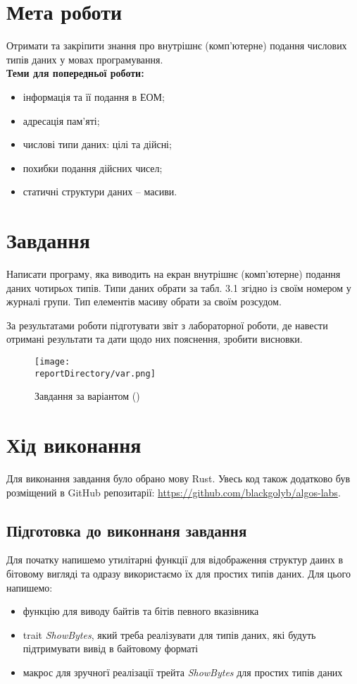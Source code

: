 \section{Мета роботи}
Отримати та закріпити знання про внутрішнє (комп’ютерне)
подання числових типів даних у мовах програмування.\\

\noindent
\textbf{Теми для попередньої роботи:}
\begin{itemize}
    \item інформація та її подання в ЕОМ;
    \item адресація пам’яті;
    \item числові типи даних: цілі та дійсні;
    \item похибки подання дійсних чисел;
    \item статичні структури даних – масиви.
\end{itemize}



\section{Завдання}
Написати програму, яка виводить на екран внутрішнє (комп’ютерне)
подання даних чотирьох типів. Типи даних обрати за табл. 3.1 згідно із своїм
номером у журналі групи. Тип елементів масиву обрати за своїм розсудом.

За результатами роботи підготувати звіт з лабораторної роботи, де
навести отримані результати та дати щодо них пояснення, зробити
висновки.

\begin{figure}[h!]
    \centering
    \texttt{[image: \\reportDirectory/var.png]}
    \caption{Завдання за варіантом (\variant)}
    \label{fig:task}
\end{figure}


\section{Хід виконання}
Для виконання завдання було обрано мову Rust.
Увесь код також додатково був розміщений в GitHub репозитарії: \href{https://github.com/blackgolyb/algos-labs}{https://github.com/blackgolyb/algos-labs}.


\newpage
\subsection{Підготовка до виконнаня завдання}
Для початку напишемо утилітарні функції для відображення структур даинх в бітовому вигляді та одразу використаємо їх для простих типів даних.
Для цього напишемо:
\begin{itemize}
    \item функцію для виводу байтів та бітів певного вказівника
    \item trait \textit{ShowBytes}, який треба реалізувати для типів даних, які будуть підтримувати вивід в байтовому форматі
    \item макрос для зручногї реалізації трейта \textit{ShowBytes} для простих типів даних
\end{itemize}

